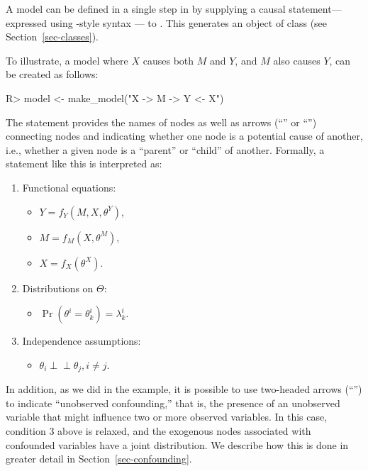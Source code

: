 \documentclass[
  11pt,
  article]{jss}
\providecommand{\tightlist}{%
  \setlength{\itemsep}{0pt}\setlength{\parskip}{0pt}}\usepackage{longtable,booktabs,array}
\renewcommand{\texttt}[1]{\code{#1}}
\begin{document}
A model can be defined in a single step in  by
supplying a causal statement---expressed using \texttt{dagitty}-style
syntax \citep{textor_robust_2016}--- to \texttt{make\_model}. This
generates an object of class \texttt{causal\_model} (see
Section~\ref{sec-classes}).

To illustrate, a model where \(X\) causes both \(M\) and \(Y\), and
\(M\) also causes \(Y\), can be created as follows:

\begin{CodeInput}
R> model <- make_model("X -> M -> Y <- X")
\end{CodeInput}

The statement provides the names of nodes as well as arrows
(``\texttt{-\textgreater{}}'' or ``\texttt{\textless{}-}'') connecting
nodes and indicating whether one node is a potential cause of another,
i.e., whether a given node is a ``parent'' or ``child'' of another.
Formally, a statement like this is interpreted as:

\begin{enumerate}
\def\labelenumi{\arabic{enumi}.}
\item
  Functional equations:

  \begin{itemize}
  \tightlist
  \item
    \(Y = f_Y(M, X, \theta^Y)\),
  \item
    \(M = f_M(X, \theta^M)\),
  \item
    \(X = f_X(\theta^X)\).
  \end{itemize}
\item
  Distributions on \(\Theta\):

  \begin{itemize}
  \tightlist
  \item
    \(\Pr(\theta^i = \theta^i_k) = \lambda^i_k\).
  \end{itemize}
\item
  Independence assumptions:

  \begin{itemize}
  \tightlist
  \item
    \(\theta_i \perp\!\!\! \perp \theta_j, i\neq j\).
  \end{itemize}
\end{enumerate}

In addition, as we did in the \citet{chickering_clinicians_1996}
example, it is possible to use two-headed arrows
(``\texttt{\textless{}-\textgreater{}}'') to indicate ``unobserved
confounding,'' that is, the presence of an unobserved variable that
might influence two or more observed variables. In this case, condition
3 above is relaxed, and the exogenous nodes associated with confounded
variables have a joint distribution. We describe how this is done in
greater detail in Section~\ref{sec-confounding}.
\end{document}
